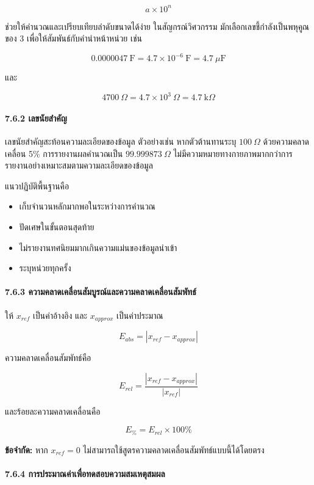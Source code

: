 \[
a\times10^n
\]

ช่วยให้คำนวณและเปรียบเทียบลำดับขนาดได้ง่าย ในสัญกรณ์วิศวกรรม มักเลือกเลขชี้กำลังเป็นพหุคูณของ 3 เพื่อให้สัมพันธ์กับคำนำหน้าหน่วย เช่น

\[
0.0000047\ \mathrm{F}=4.7\times10^{-6}\ \mathrm{F}=4.7\ \mu\mathrm{F}
\]

และ

\[
4700\ \Omega=4.7\times10^3\ \Omega=4.7\ \mathrm{k}\Omega
\]

\paragraph{7.6.2 เลขนัยสำคัญ}

เลขนัยสำคัญสะท้อนความละเอียดของข้อมูล ตัวอย่างเช่น หากตัวต้านทานระบุ $100\ \Omega$ ด้วยความคลาดเคลื่อน 5\% การรายงานผลคำนวณเป็น $99.999873\ \Omega$ ไม่มีความหมายทางกายภาพมากกว่าการรายงานอย่างเหมาะสมตามความละเอียดของข้อมูล

แนวปฏิบัติพื้นฐานคือ

\begin{itemize}
    \item เก็บจำนวนหลักมากพอในระหว่างการคำนวณ
    \item ปัดเศษในขั้นตอนสุดท้าย
    \item ไม่รายงานทศนิยมมากเกินความแม่นของข้อมูลนำเข้า
    \item ระบุหน่วยทุกครั้ง
\end{itemize}

\paragraph{7.6.3 ความคลาดเคลื่อนสัมบูรณ์และความคลาดเคลื่อนสัมพัทธ์}

ให้ $x_{ref}$ เป็นค่าอ้างอิง และ $x_{approx}$ เป็นค่าประมาณ

\[
E_{abs}=|x_{ref}-x_{approx}|
\]

ความคลาดเคลื่อนสัมพัทธ์คือ

\[
E_{rel}=\frac{|x_{ref}-x_{approx}|}{|x_{ref}|}
\]

และร้อยละความคลาดเคลื่อนคือ

\[
E_{\%}=E_{rel}\times100\%
\]

\textbf{ข้อจำกัด:} หาก $x_{ref}=0$ ไม่สามารถใช้สูตรความคลาดเคลื่อนสัมพัทธ์แบบนี้ได้โดยตรง

\paragraph{7.6.4 การประมาณค่าเพื่อทดสอบความสมเหตุสมผล}

